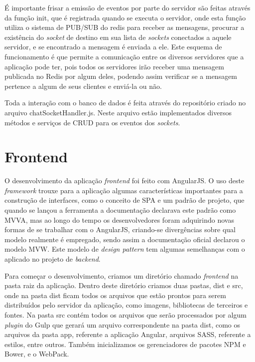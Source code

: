 É importante frisar a emissão de eventos por parte do servidor são feitas através da função init, que é registrada quando se executa o servidor, onde esta função utiliza o sistema de PUB/SUB do redis para receber as mensagens, procurar a existência do \textit{socket} de destino em sua lista de \textit{sockets} conectados a aquele servidor, e se encontrado a mensagem é enviada a ele. Este esquema de funcionamento é que permite a comunicação entre os diversos servidores que a aplicação pode ter, pois todos os servidores irão receber uma mensagem publicada no Redis por algum deles, podendo assim verificar se a mensagem pertence a algum de seus clientes e enviá-la ou não.

Toda a interação com o banco de dados é feita através do repositório criado no arquivo chatSocketHandler.js. Neste arquivo estão implementados diversos métodos e serviços de CRUD para os eventos dos \textit{sockets}.

\section{Frontend}
O desenvolvimento da aplicação \textit{frontend} foi feito com AngularJS. O uso deste \textit{framework} trouxe para a aplicação algumas características importantes para a construção de interfaces, como o conceito de SPA e um padrão de projeto, que quando se lançou a ferramenta a documentação declarava este padrão como MVVA, mas ao longo do tempo os desenvolvedores foram adquirindo novas formas de se trabalhar com o AngularJS, criando-se divergências sobre qual modelo realmente é empregado, sendo assim a documentação oficial declarou o modelo MVW. Este modelo de \textit{design pattern} tem algumas semelhanças com o aplicado no projeto de \textit{backend}.

Para começar o desenvolvimento, criamos um diretório chamado \textit{frontend} na pasta raiz da aplicação. Dentro deste diretório criamos duas pastas, dist e src, onde na pasta dist ficam todos os arquivos que estão prontos para serem distribuídos pelo servidor da aplicação, como imagens, bibliotecas de terceiros e fontes. Na pasta src contém todos os arquivos que serão processados por algum \textit{plugin} do Gulp que gerará um arquivo correspondente na pasta dist, como os arquivos da pasta app, referente a aplicação Angular, arquivos SASS, referente a estilos, entre outros. Também inicializamos os gerenciadores de pacotes NPM e Bower, e o WebPack.

